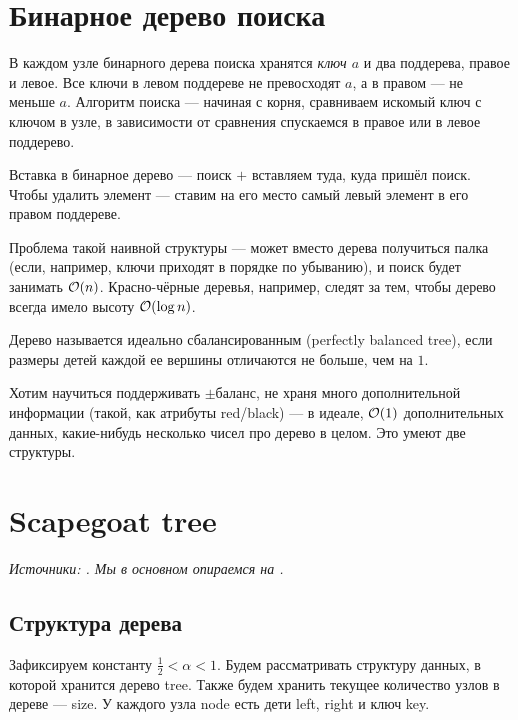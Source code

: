 \section{Бинарное дерево поиска} 

В каждом узле бинарного дерева поиска хранятся {\it ключ $a$} и два поддерева, правое и левое. Все ключи в левом поддереве не превосходят $a$, а в правом — не меньше $a$. Алгоритм поиска — начиная с корня, сравниваем искомый ключ с ключом в узле, в зависимости от сравнения спускаемся в правое или в левое поддерево.

Вставка в бинарное дерево — поиск $+$ вставляем туда, куда пришёл поиск. Чтобы удалить элемент --- ставим на его место самый левый элемент в его правом поддереве.

Проблема такой наивной структуры — может вместо дерева получиться палка (если, например, ключи приходят в порядке по убыванию), и поиск будет занимать $\mathcal{O}(n)$. Красно-чёрные деревья, например, следят за тем, чтобы дерево всегда имело высоту $\mathcal{O}(\log n)$.

\begin{definition}
	Дерево называется идеально сбалансированным (perfectly balanced tree), если размеры детей каждой ее вершины отличаются не больше, чем на $1$.
\end{definition}

Хотим научиться поддерживать $\pm$баланс, не храня много дополнительной информации (такой, как атрибуты red/black) — в идеале, $\mathcal{O}(1)$ дополнительных данных, какие-нибудь несколько чисел про дерево в целом. Это умеют две структуры.

\section{Scapegoat tree} 

 {\it Источники: \cite{galperin1993scapegoat,andersson1989improving}. Мы в основном опираемся на \cite{galperin1993scapegoat}.}

 \subsection{Структура дерева}

Зафиксируем константу $\frac{1}{2} < \alpha < 1$. Будем рассматривать структуру данных, в которой хранится дерево tree. Также будем хранить текущее количество узлов в дереве — size. У каждого узла node есть дети left, right и ключ key.

